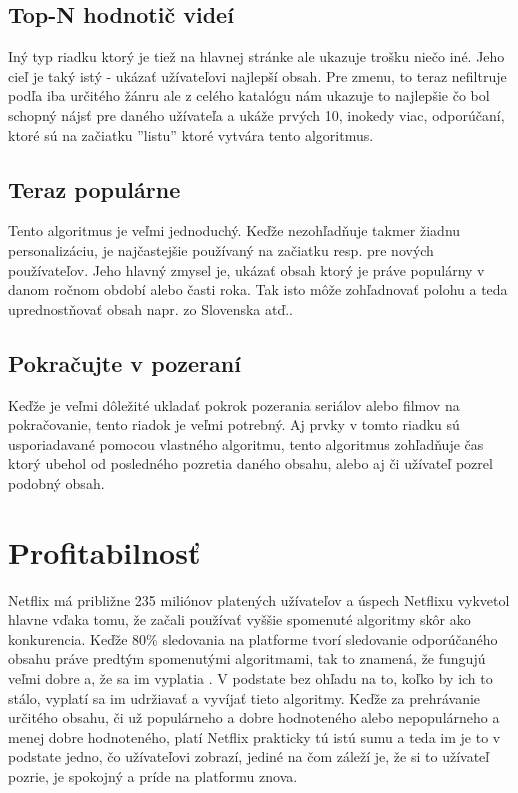 \documentclass[10pt,twoside,slovak,a4paper]{article}
\begin{document}
\subsection{Top-N hodnotič videí}
Iný typ riadku ktorý je tiež na hlavnej stránke ale ukazuje trošku niečo iné. Jeho cieľ je taký istý - ukázať užívateľovi najlepší obsah. Pre zmenu, to teraz nefiltruje podľa iba určitého žánru ale z celého katalógu nám ukazuje to najlepšie čo bol schopný nájsť pre daného užívateľa a ukáže prvých 10, inokedy viac, odporúčaní, ktoré sú na začiatku ''listu'' ktoré vytvára tento algoritmus.\cite{amatriain2015recommender}
\subsection{Teraz populárne}
Tento algoritmus je veľmi jednoduchý. Keďže nezohľadňuje takmer žiadnu personalizáciu, je najčastejšie používaný na začiatku resp. pre nových používateľov. Jeho hlavný zmysel je, ukázať obsah ktorý je práve populárny v danom ročnom období alebo časti roka. Tak isto môže zohľadnovať polohu a teda uprednostňovať obsah napr. zo Slovenska atď..
\subsection{Pokračujte v pozeraní}
Keďže je veľmi dôležité ukladať pokrok pozerania seriálov alebo filmov na pokračovanie, tento riadok je veľmi potrebný. Aj prvky v tomto riadku sú usporiadavané pomocou vlastného algoritmu, tento algoritmus zohľadňuje čas ktorý ubehol od posledného pozretia daného obsahu, alebo aj či užívateľ pozrel podobný obsah.


\section{Profitabilnosť} \label{Profit}
Netflix má približne 235 miliónov platených užívateľov a úspech Netflixu vykvetol hlavne vďaka tomu, že začali používať vyššie spomenuté algoritmy skôr ako konkurencia.
Keďže 80\% sledovania na platforme tvorí sledovanie odporúčaného obsahu práve predtým spomenutými algoritmami, tak to znamená, že fungujú veľmi dobre a, že sa im vyplatia \cite{pub.1158091188}. V podstate bez ohľadu na to, koľko by ich to stálo, vyplatí sa im udržiavať a vyvíjať tieto algoritmy. Keďže za prehrávanie určitého obsahu, či už populárneho a dobre hodnoteného alebo nepopulárneho a menej dobre hodnoteného, platí Netflix prakticky tú istú sumu a teda im je to v podstate jedno, čo užívateľovi zobrazí, jediné na čom záleží je, že si to užívateľ pozrie, je spokojný a príde na platformu znova. \cite{amatriain2015recommender}
\end{document}
